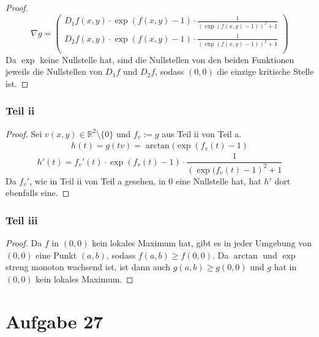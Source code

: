 \documentclass[10pt,a4paper]{article}
\begin{document}
\begin{proof}
\begin{equation}
\nabla g = \begin{pmatrix}
D_{1}f(x, y) \cdot \exp(f(x, y) - 1) \cdot \frac{1}{\left( \exp(f(x, y) - 1) \right)^{2} + 1}\\
D_{2}f(x, y) \cdot \exp(f(x, y) - 1) \cdot \frac{1}{\left( \exp(f(x, y) - 1) \right)^{2} + 1}\\
\end{pmatrix}
\end{equation}
Da $\exp$ keine Nullstelle hat, sind die Nullstellen von den beiden Funktionen jeweils die Nullstellen von $D_{1}f$ und $D_{2}f$, sodass $(0, 0)$ die einzige kritische Stelle ist.
\end{proof}

\subsubsection*{Teil ii}

\begin{proof}
Sei $v (x, y) \in \mathbb{R}^{2} \setminus \{0\}$ und $f_{v} := g$ aus Teil ii von Teil a.
\begin{align*}
h(t) = g(tv) = \arctan(\exp(f_{v}(t) - 1)
\end{align*}
\begin{equation}
h'(t) = f_{v}'(t) \cdot \exp(f_{v}(t) - 1) \cdot \frac{1}{\left( \exp(f_{v}(t) - 1 \right)^{2} + 1}
\end{equation}
Da $f_{v}'$, wie in Teil ii von Teil a gesehen, in $0$ eine Nullstelle hat, hat $h'$ dort ebenfalls eine.
\end{proof}

\subsubsection*{Teil iii}

\begin{proof}
Da $f$ in $(0, 0)$ kein lokales Maximum hat, gibt es in jeder Umgebung von $(0, 0)$ eine Punkt $(a, b)$, sodass $f(a, b) \ge f(0, 0)$.
Da $\arctan$ und $\exp$ streng monoton wachsend ist, ist dann auch $g(a, b) \ge g(0, 0)$ und $g$ hat in $(0, 0)$ kein lokales Maximum.
\end{proof}

\section*{Aufgabe 27}
\end{document}
